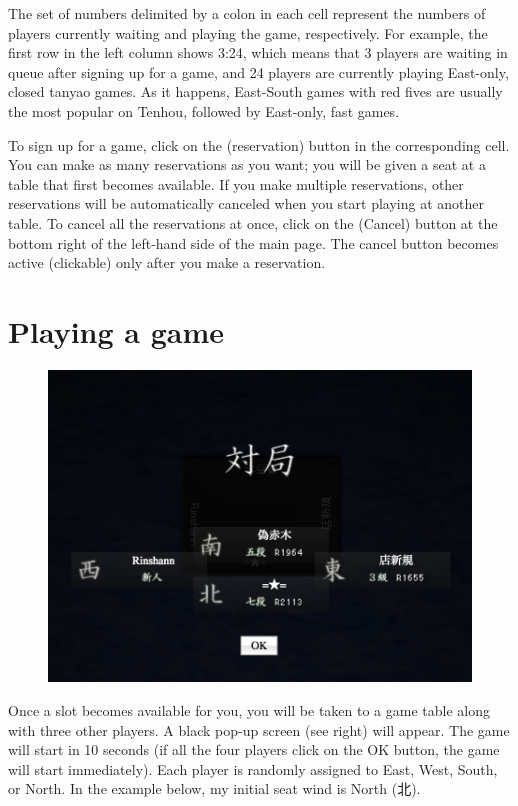 \bigskip
The set of numbers delimited by a colon in each cell represent the numbers of players currently waiting and playing the game, respectively. For example, the first row in the left column shows 3:24, which means that 3 players are waiting in queue after signing up for a game, and 24 players are currently playing East-only, closed {\jap tanyao} games. As it happens, East-South games with red fives are usually the most popular on {\jap Tenhou}, followed by East-only, fast games. 

\bigskip
To sign up for a game, click on the  (reservation) button in the corresponding cell. You can make as many reservations as you want; you will be given a seat at a table that first becomes available. If you make multiple reservations, other reservations will be automatically canceled when you start playing at another table. To cancel all the reservations at once, click on the  (Cancel) button at the bottom right of the left-hand side of the main page. The cancel button becomes active (clickable) only after you make a reservation. 

\newpage
\section{Playing a game}

\begin{figure}
\vspace{-20pt}
\begin{center}
\includegraphics[width=.45\textwidth,clip]{figs/taikyoku}
\end{center}
\vspace{-20pt}
\end{figure}

Once a slot becomes available for you, you will be taken to a game table along with three other players. A black pop-up screen (see right) will appear. The game will start in 10 seconds (if all the four players click on the OK button, the game will start immediately). Each player is randomly assigned to East, West, South, or North. In the example below, my initial seat wind is North (北). 

